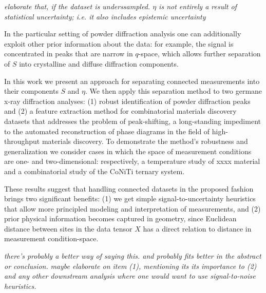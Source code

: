 \documentclass[12pt]{iopart}
\begin{document}
\emph{elaborate that, if the dataset is underssampled. $\eta$ is not entirely a result of statistical uncertainty; i.e. it also includes epistemic uncertainty}

In the particular setting of powder diffraction analysis one can additionally exploit other prior information about the data: for example, the signal is concentrated in peaks that are narrow in $q$-space, which allows further separation of $S$ into crystalline and diffuse diffraction components.


In this work we present an approach for separating connected
measurements into their components $S$ and $\eta$. We then apply this
separation method to two germane x-ray diffraction analyses: (1) robust
identification of powder diffraction peaks and (2) a feature extraction
method for combinatorial materials discovery datasets that addresses the
problem of peak-shifting, a long-standing impediment to the automated
reconstruction of phase diagrams in the field of high-throughput
materials discovery. To demonstrate the method's robustness and generalization we
consider cases in which the space of measurement conditions are one- and
two-dimensional: respectively, a temperature study of xxxx material and
a combinatorial study of the CoNiTi ternary system.

These results suggest that handling connected datasets in the proposed fashion
brings two significant benefits: (1) we get simple signal-to-uncertainty
heuristics that allow more principled modeling and interpretation of
measurements, and (2) prior physical information becomes captured in
geometry, since Euclidean distance between sites in the data tensor $X$
has a direct relation to distance in measurement condition-space.

\emph{there's probably a better way of saying this. and probably fits better in the abstract or conclusion.}
\emph{maybe elaborate on item (1), mentioning its its importance to (2) and any other downstream analysis where one would want to use signal-to-noise heuristics.}

\end{document}
